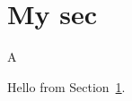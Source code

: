 \documentclass{article}
\begin{document}
\section{My sec}
\label{sec:mysec}

A

Hello from Section~\ref{sec:mysec}.
\end{document}
